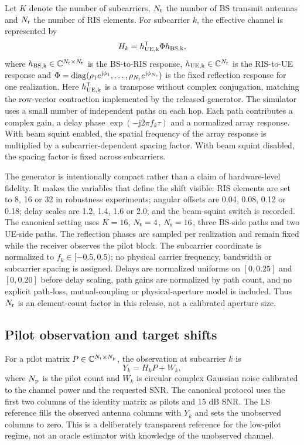 \documentclass[10pt,twocolumn]{article}
\begin{document}
Let $K$ denote the number of subcarriers, $N_{\rm t}$ the number of BS transmit antennas and $N_{\rm r}$ the number of RIS elements. For subcarrier $k$, the effective channel is represented by
\begin{equation}
 H_k = h_{\rm UE,k}^{\mathsf T} \Phi h_{\rm BS,k},
\end{equation}
where $h_{\rm BS,k}\in\mathbb{C}^{N_{\rm r}\times N_{\rm t}}$ is the BS-to-RIS response, $h_{\rm UE,k}\in\mathbb{C}^{N_{\rm r}}$ is the RIS-to-UE response and $\Phi=\operatorname{diag}(\rho_1e^{\mathrm j\phi_1},\ldots,\rho_{N_{\rm r}}e^{\mathrm j\phi_{N_{\rm r}}})$ is the fixed reflection response for one realization. Here $h_{\rm UE,k}^{\mathsf T}$ is a transpose without complex conjugation, matching the row-vector contraction implemented by the released generator. The simulator uses a small number of independent paths on each hop. Each path contributes a complex gain, a delay phase $\exp(-\mathrm j2\pi f_k\tau)$ and a normalized array response. With beam squint enabled, the spatial frequency of the array response is multiplied by a subcarrier-dependent spacing factor. With beam squint disabled, the spacing factor is fixed across subcarriers.

The generator is intentionally compact rather than a claim of hardware-level fidelity. It makes the variables that define the shift visible: RIS elements are set to 8, 16 or 32 in robustness experiments; angular offsets are 0.04, 0.08, 0.12 or 0.18; delay scales are 1.2, 1.4, 1.6 or 2.0; and the beam-squint switch is recorded. The canonical setting uses $K=16$, $N_{\rm t}=4$, $N_{\rm r}=16$, three BS-side paths and two UE-side paths. The reflection phases are sampled per realization and remain fixed while the receiver observes the pilot block. The subcarrier coordinate is normalized to $f_k\in[-0.5,0.5)$; no physical carrier frequency, bandwidth or subcarrier spacing is assigned. Delays are normalized uniforms on $[0,0.25]$ and $[0,0.20]$ before delay scaling, path gains are normalized by path count, and no explicit path-loss, mutual-coupling or physical-aperture model is included. Thus $N_{\rm r}$ is an element-count factor in this release, not a calibrated aperture size.

\subsection{Pilot observation and target shifts}

For a pilot matrix $P\in\mathbb{C}^{N_{\rm t}\times N_{\rm p}}$, the observation at subcarrier $k$ is
\begin{equation}
 Y_k = H_kP + W_k,
\end{equation}
where $N_{\rm p}$ is the pilot count and $W_k$ is circular complex Gaussian noise calibrated to the channel power and the requested SNR. The canonical protocol uses the first two columns of the identity matrix as pilots and 15 dB SNR. The LS reference fills the observed antenna columns with $Y_k$ and sets the unobserved columns to zero. This is a deliberately transparent reference for the low-pilot regime, not an oracle estimator with knowledge of the unobserved channel.
\end{document}
